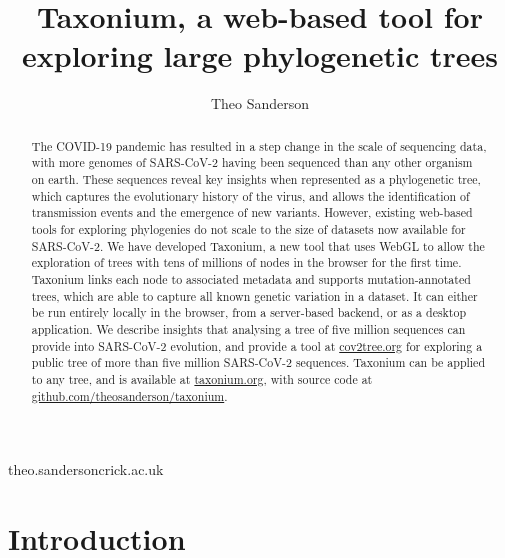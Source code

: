 
\title{Taxonium, a web-based tool for exploring large phylogenetic trees}

\author[1]{Theo Sanderson }

\date{}

\maketitle

\begin{abstract}
The COVID-19 pandemic has resulted in a step change in the scale of sequencing data, with more genomes of SARS-CoV-2 having been sequenced than any other organism on earth. These sequences reveal key insights when represented as a phylogenetic tree, which captures the evolutionary history of the virus, and allows the identification of transmission events and the emergence of new variants. However, existing web-based tools for exploring phylogenies do not scale to the size of datasets now available for SARS-CoV-2. We have developed Taxonium, a new tool that uses WebGL to allow the exploration of trees with tens of millions of nodes in the browser for the first time. Taxonium links each node to associated metadata and supports mutation-annotated trees, which are able to capture all known genetic variation in a dataset. It can either be run entirely locally in the browser, from a server-based backend, or as a desktop application.  We describe insights that analysing a tree of five million sequences can provide into SARS-CoV-2 evolution, and provide a tool at \href{http://cov2tree.org}{cov2tree.org} for exploring a public tree of more than five million SARS-CoV-2 sequences. Taxonium can be applied to any tree, and is available at \href{http://taxonium.org}{taxonium.org}, with source code at \href{https://github.com/theosanderson/taxonium}{github.com/theosanderson/taxonium}.


\end{abstract}


\begin{corrauthor}
theo.sanderson\at crick.ac.uk
\end{corrauthor}

\section*{Introduction}\label{s:introduction}

